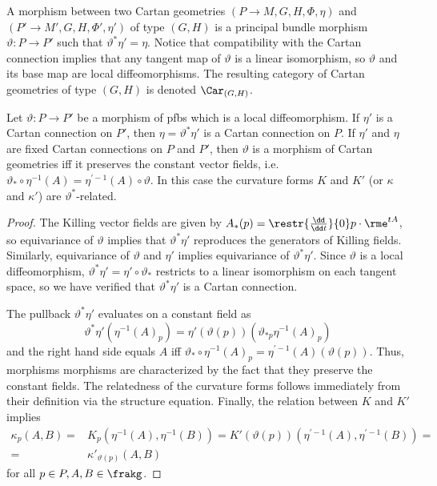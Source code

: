 \begin{defn}
    A morphism between two Cartan geometries $(P\to M,G,H,\Phi,\eta)$ and $(P'\to M',G,H,\Phi',\eta') $ of type $(G,H)$ is a principal bundle morphism $\vartheta:P\to P'$ such that $\vartheta^\ast\eta '=\eta$. Notice that compatibility with the Cartan connection implies that any tangent map of $\vartheta$ is a linear isomorphism, so $\vartheta$ and its base map are local diffeomorphisms. The resulting category of Cartan geometries of type $(G,H)$ is denoted $\Car_{(G,H)}$.
\end{defn}

\begin{lem}\label{lem 1.5.2 Cap}
    Let $\vartheta:P\to P'$ be a morphism of \glspl{pfb} which is a local diffeomorphism. If $\eta'$ is a Cartan connection on $P'$, then $\eta=\vartheta^\ast\eta'$ is a Cartan connection on $P$. If $\eta'$ and $\eta$ are fixed Cartan connections on $P$ and $P'$, then $\vartheta$ is a morphism of Cartan geometries iff it preserves the constant vector fields, i.e.\ $\vartheta_\ast\circ \eta^{-1}(A)=\eta^{\prime-1}(A)\circ\vartheta$. In this case the curvature forms $K$ and $K'$ (or $\kappa$ and $\kappa'$) are $\vartheta^\ast$-related.
\end{lem}
\begin{proof}
    The Killing vector fields are given by $A_\ast(p)=\restr{\frac{\dd}{\dd t}}{0}p\cdot \rme^{tA}$, so equivariance of $\vartheta$ implies that $\vartheta^\ast \eta'$ reproduces the generators of Killing fields. Similarly, equivariance of $\vartheta$ and $\eta'$ implies equivariance of $\vartheta^\ast\eta'$. Since $\vartheta$ is a local diffeomorphism, $\vartheta^\ast\eta'=\eta'\circ \vartheta_\ast$ restricts to a linear isomorphism on each tangent space, so we have verified that $\vartheta^\ast\eta'$ is a Cartan connection.

    The pullback $\vartheta^\ast\eta'$ evaluates on a constant field as 
    \[\vartheta^\ast\eta'(\eta^{-1}(A)_p)=\eta'(\vartheta(p))\left(\vartheta_{\ast p}\eta^{-1}(A)_p\right)\]
    and the right hand side equals $A$ iff $\vartheta_\ast\circ \eta^{-1}(A)_p=\eta^{\prime-1}(A)(\vartheta(p))$. Thus, morphisms morphisms are characterized by the fact that they preserve the constant fields. The relatedness of the curvature forms follows immediately from their definition via the structure equation. Finally, the relation between $K$ and $K'$ implies 
    \begin{align}
        \kappa_p(A,B)=&K_p\left(\eta^{-1}(A),\eta^{-1}(B)\right)=K'(\vartheta(p))\left(\eta^{\prime-1}(A),\eta^{\prime-1}(B)\right)=\\=&\kappa'_{\vartheta(p)}(A,B)
    \end{align}
    for all $p\in P, A,B\in\frakg$.
\end{proof}


